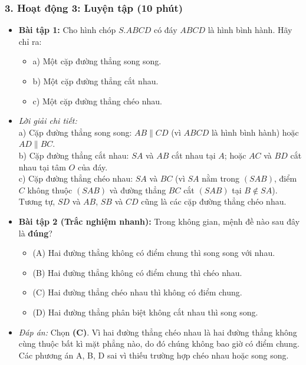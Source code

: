 \documentclass[12pt, a4paper]{article}
\begin{document}
\subsubsection*{3. Hoạt động 3: Luyện tập (10 phút)}
\begin{itemize}
    \item \textbf{Bài tập 1:} Cho hình chóp $S.ABCD$ có đáy $ABCD$ là hình bình hành. Hãy chỉ ra:
    \begin{itemize}
        \item a) Một cặp đường thẳng song song.
        \item b) Một cặp đường thẳng cắt nhau.
        \item c) Một cặp đường thẳng chéo nhau.
    \end{itemize}
    \item \textit{Lời giải chi tiết:}\\
    a) Cặp đường thẳng song song: $AB \parallel CD$ (vì $ABCD$ là hình bình hành) hoặc $AD \parallel BC$.\\
    b) Cặp đường thẳng cắt nhau: $SA$ và $AB$ cắt nhau tại $A$; hoặc $AC$ và $BD$ cắt nhau tại tâm $O$ của đáy.\\
    c) Cặp đường thẳng chéo nhau: $SA$ và $BC$ (vì $SA$ nằm trong $(SAB)$, điểm $C$ không thuộc $(SAB)$ và đường thẳng $BC$ cắt $(SAB)$ tại $B \notin SA$). Tương tự, $SD$ và $AB$, $SB$ và $CD$ cũng là các cặp đường thẳng chéo nhau.
    \item \textbf{Bài tập 2 (Trắc nghiệm nhanh):} Trong không gian, mệnh đề nào sau đây là \textbf{đúng}?
    \begin{itemize}
        \item (A) Hai đường thẳng không có điểm chung thì song song với nhau.
        \item (B) Hai đường thẳng không có điểm chung thì chéo nhau.
        \item (C) Hai đường thẳng chéo nhau thì không có điểm chung.
        \item (D) Hai đường thẳng phân biệt không cắt nhau thì song song.
    \end{itemize}
    \item \textit{Đáp án:} Chọn \textbf{(C)}. Vì hai đường thẳng chéo nhau là hai đường thẳng không cùng thuộc bất kì mặt phẳng nào, do đó chúng không bao giờ có điểm chung. Các phương án A, B, D sai vì thiếu trường hợp chéo nhau hoặc song song.
\end{itemize}
\end{document}
